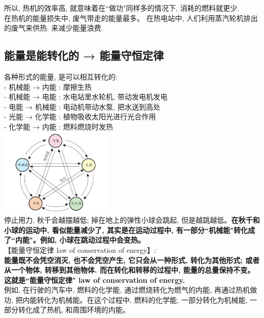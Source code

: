 \documentclass[UTF8]{ctexart}
\begin{document}
	所以, 热机的效率高, 就意味着在``做功"同样多的情况下, 消耗的燃料就更少. \\
	
	在热机的能量损失中, 废气带走的能量最多。 在热电站中, 人们利用蒸汽轮机排出的废气来供热. 来减少能量浪费. \\

	
	\vspace{1em} 
	
	
	\subsection{能量是能转化的 → 能量守恒定律}
	
	各种形式的能量, 是可以相互转化的: \\
	- 机械能 → 内能 : 摩擦生热 \\
	- 机械能 → 电能 : 水电站里水轮机, 带动发电机发电 \\
	- 电能 → 机械能 : 电动机带动水泵, 把水送到高处 \\
	- 光能 → 化学能 : 植物吸收太阳光进行光合作用 \\
	- 化学能 → 内能 : 燃料燃烧时发热 \\
	
	\includegraphics[width=0.4\textwidth]{img/0050.png} \\
	
	停止用力, 秋千会越摆越低; 掉在地上的弹性小球会跳起, 但是越跳越低。\textbf{在秋千和小球的运动中, 看似能量减少了, 其实是在运动过程中, 有一部分``机械能"转化成了``内能"。例如, 小球在跳动过程中会变热。} \\
	
	
	【能量守恒定律 law of conservation of energy】: \\
	\textbf{能量既不会凭空消灭, 也不会凭空产生, 它只会从一种形式, 转化为其他形式; 或者从一个物体, 转移到其他物体. 而在转化和转移的过程中, 能量的总量保持不变。这就是``能量守恒定律" law of conservation of energy.} \\
	
	例如, 在行驶的汽车中, 燃料的化学能, 通过燃烧转化为燃气的内能, 再通过热机做功, 把内能转化为机械能。在这个过程中, 燃料的化学能, 一部分转化为机械能, 一部分转化成了热机, 和周围环境的内能。 \\
	
\end{document}
